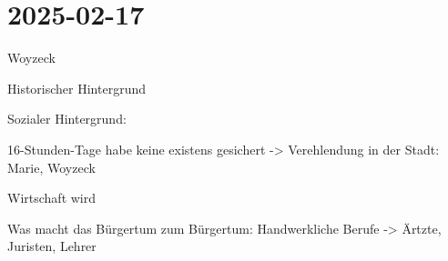 \section{2025-02-17}

\startitemize[packed]
\item Woyzeck
\item Historischer Hintergrund
\stopitemize


Sozialer Hintergrund:

\startitemize[packed]
\item 16-Stunden-Tage habe keine existens gesichert -> Verehlendung in der Stadt: Marie, Woyzeck
\item Wirtschaft wird 
\item Was macht das Bürgertum zum Bürgertum: Handwerkliche Berufe -> Ärtzte, Juristen, Lehrer
\stopitemize
